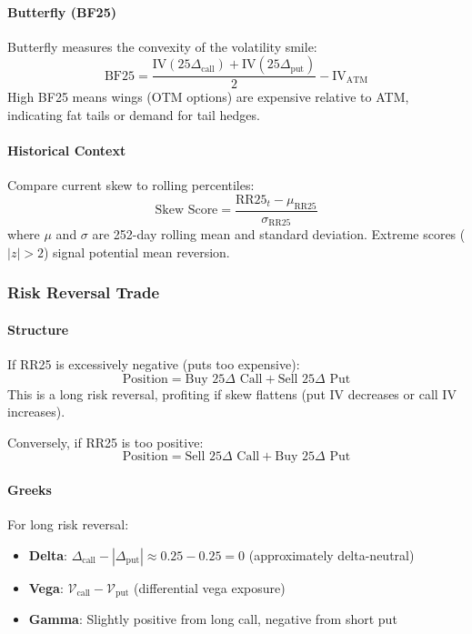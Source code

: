 \paragraph{Butterfly (BF25)}

Butterfly measures the convexity of the volatility smile:
\[
\text{BF25} = \frac{\text{IV}(25\Delta_{\text{call}}) + \text{IV}(25\Delta_{\text{put}})}{2} - \text{IV}_{\text{ATM}}
\]
High BF25 means wings (OTM options) are expensive relative to ATM, indicating fat tails or demand for tail hedges.

\paragraph{Historical Context}

Compare current skew to rolling percentiles:
\[
\text{Skew Score} = \frac{\text{RR25}_t - \mu_{\text{RR25}}}{\sigma_{\text{RR25}}}
\]
where $\mu$ and $\sigma$ are 252-day rolling mean and standard deviation. Extreme scores ($|z| > 2$) signal potential mean reversion.

\subsubsection{Risk Reversal Trade}

\paragraph{Structure}

If RR25 is excessively negative (puts too expensive):
\[
\text{Position} = \text{Buy 25}\Delta \text{ Call} + \text{Sell 25}\Delta \text{ Put}
\]
This is a long risk reversal, profiting if skew flattens (put IV decreases or call IV increases).

Conversely, if RR25 is too positive:
\[
\text{Position} = \text{Sell 25}\Delta \text{ Call} + \text{Buy 25}\Delta \text{ Put}
\]

\paragraph{Greeks}

For long risk reversal:
\begin{itemize}
  \item \textbf{Delta}: $\Delta_{\text{call}} - |\Delta_{\text{put}}| \approx 0.25 - 0.25 = 0$ (approximately delta-neutral)
  \item \textbf{Vega}: $\mathcal{V}_{\text{call}} - \mathcal{V}_{\text{put}}$ (differential vega exposure)
  \item \textbf{Gamma}: Slightly positive from long call, negative from short put
\end{itemize}


